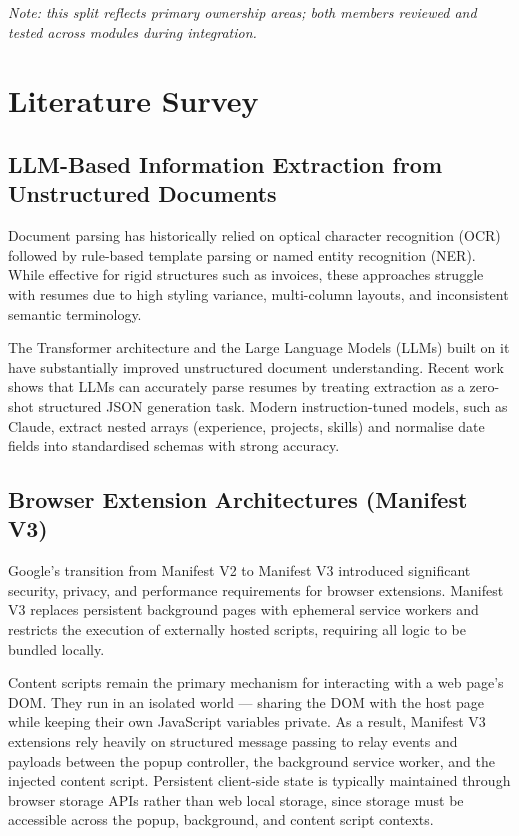 \documentclass[12pt,a4paper]{report}
\begin{document}
\textit{Note: this split reflects primary ownership areas; both members reviewed and tested across modules during integration.}

\chapter{Literature Survey}

\section{LLM-Based Information Extraction from Unstructured Documents}
Document parsing has historically relied on optical character recognition (OCR) followed by rule-based template parsing or named entity recognition (NER). While effective for rigid structures such as invoices, these approaches struggle with resumes due to high styling variance, multi-column layouts, and inconsistent semantic terminology.

The Transformer architecture \cite{vaswani2017attention} and the Large Language Models (LLMs) built on it have substantially improved unstructured document understanding. Recent work shows that LLMs can accurately parse resumes by treating extraction as a zero-shot structured JSON generation task. Modern instruction-tuned models, such as Claude, extract nested arrays (experience, projects, skills) and normalise date fields into standardised schemas with strong accuracy.

\section{Browser Extension Architectures (Manifest V3)}
Google's transition from Manifest V2 to Manifest V3 introduced significant security, privacy, and performance requirements for browser extensions. Manifest V3 replaces persistent background pages with ephemeral service workers and restricts the execution of externally hosted scripts, requiring all logic to be bundled locally.

Content scripts remain the primary mechanism for interacting with a web page's DOM. They run in an isolated world — sharing the DOM with the host page while keeping their own JavaScript variables private. As a result, Manifest V3 extensions rely heavily on structured message passing to relay events and payloads between the popup controller, the background service worker, and the injected content script. Persistent client-side state is typically maintained through browser storage APIs rather than web local storage, since storage must be accessible across the popup, background, and content script contexts.
\end{document}
